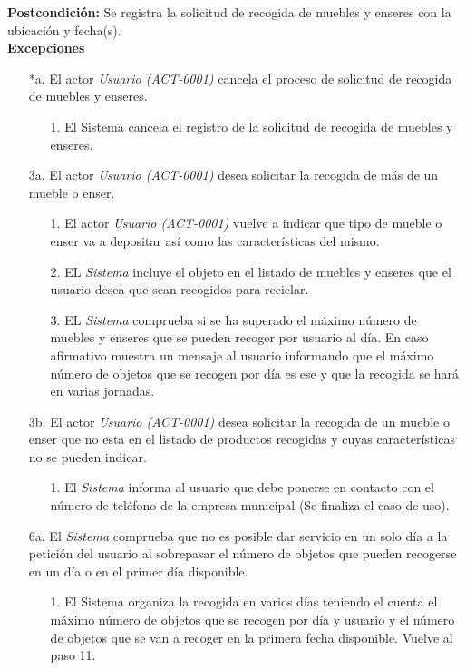\textbf{Postcondición: } 
 Se registra la solicitud de recogida de muebles y enseres con la ubicación y fecha(s).\\

\textbf{Excepciones} 
\begin{enumerate}
\item[*a.] El actor \textit{Usuario (ACT-0001)} cancela el proceso de solicitud de recogida de muebles y enseres.
	\begin{enumerate}
		\item[1.] El Sistema cancela el registro de la solicitud de recogida de muebles y enseres.
	\end{enumerate}
\item[3a.] El actor \textit{Usuario (ACT-0001)} desea solicitar la recogida de más de un mueble o enser.
	\begin{enumerate}
		 \item[1.] El actor \textit{Usuario (ACT-0001)} vuelve a indicar que tipo de mueble o enser va a depositar así como las características del mismo.
		 \item[2.] EL \textit{Sistema} incluye el objeto en el listado de muebles y enseres que el usuario desea que sean recogidos para reciclar.
		 \item[3.] EL \textit{Sistema} comprueba si se ha superado el máximo número de muebles y enseres que se pueden recoger por usuario al día. En caso afirmativo muestra un mensaje al usuario informando que el máximo número de objetos que se recogen por día es ese y que la recogida se hará en varias jornadas.
	\end{enumerate}
\item[3b.] El actor \textit{Usuario (ACT-0001)} desea solicitar la recogida de un mueble o enser que no esta en el listado de productos recogidas y cuyas características no se pueden indicar.
	\begin{enumerate}
		\item[1.] El \textit{Sistema} informa al usuario que debe ponerse en contacto con el número de teléfono de la empresa municipal (Se finaliza el caso de uso).
	\end{enumerate}	
\item[6a.] El \textit{Sistema} comprueba que no es posible dar servicio en un solo día a la petición del usuario al sobrepasar el número de objetos que pueden recogerse en un día o en el primer día disponible.
	\begin{enumerate}
		\item[1.] El Sistema organiza la recogida en varios días teniendo el cuenta el máximo número de objetos que se recogen por día y usuario y el número de objetos que se van a recoger en la primera fecha disponible. Vuelve al paso 11.

\end{enumerate}
\end{enumerate}
